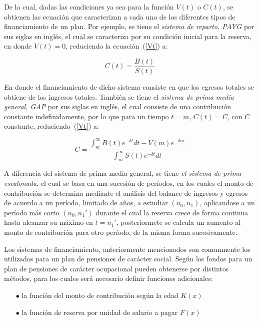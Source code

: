 \documentclass[12pt,letterpaper,titlepage]{article}
\begin{document}
De la cual, dadas las condiciones ya sea para la función $V(t)$ o $C(t)$, se obtienen las ecuación que caracterizan a cada uno de los diferentes tipos de financiamiento de un plan. Por ejemplo, se tiene el \textit{sistema de reparto, PAYG} por sus siglas en inglés, el cual se caracteriza por su condición inicial para la reserva, en donde $V(t)=0$, reduciendo la ecuación~(\ref{Vt}) a:

\begin{equation}\label{payg}
C(t)=\frac{B(t)}{S(t)}
\end{equation}

En donde el financiamiento de dicho sistema consiste en que los egresos totales se obtiene de los ingresos totales. También se tiene el \textit{sistema de prima media general, GAP} por sus siglas en inglés, el cual consiste de una contribución constante indefinidamente, por lo que para un tiempo $t=m$, $C(t)=C$, con $C$ constante, reduciendo~(\ref{Vt}) a:

\begin{equation}\label{gap}
C=\dfrac{\int_{m}^{\infty}B(t)e^{-\delta t}dt-V(m)e^{-\delta m}}{\int^{\infty}_{m}S(t)e^{-\delta t}dt}
\end{equation}

A diferencia del sistema de prima media general, se tiene \textit{el sistema de prima escalonada}, el cual se basa en una sucesión de períodos, en los cuales el monto de contribución se determina mediante el análisis del balance de ingresos y egresos de acuerdo a un período, limitado de años, a estudiar $(n_{0}, n_{1})$, aplicandose a un período más corto $(n_{0}, n_{1}')$ durante el cual la reserva crece de forma continua hasta alcanzar su máximo en $t=n_{1}'$, posteriormete se calcula un aumento al monto de contribución para otro período, de la misma forma sucesivamente.

Los sistemas de financiamiento, anteriormente mencionados son comunmente los utilizados para un plan de pensiones de carácter social. Según \cite{778} los fondos para un plan de pensiones de carácter ocupacional pueden obtenerse por distintos métodos, para los cuales será necesario definir funciones adicionales:

\begin{itemize}
	\item [$\bullet$] la función del monto de contribución según la edad $K(x)$
	\item [$\bullet$] la función de reserva por unidad de salario a pagar $F(x)$
\end{itemize}
\end{document}
